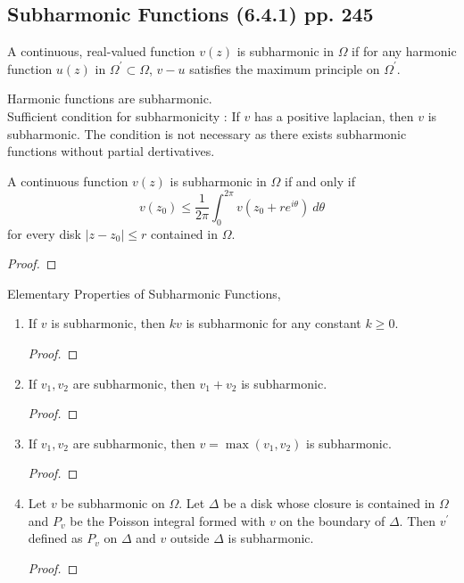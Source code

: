 \subsection{Subharmonic Functions (6.4.1) pp. 245}
\begin{definition}[subharmonic]
	A continuous, real-valued function $v(z)$ is subharmonic in $\Omega$ if for any harmonic function $u(z)$ in $\Omega^\prime \subset \Omega$, $v-u$ satisfies the maximum principle on $\Omega^\prime$.
\end{definition}

\begin{remark}
	Harmonic functions are subharmonic.\\
	
	Sufficient condition for subharmonicity : If $v$ has a positive laplacian, then $v$ is subharmonic. The condition is not necessary as there exists subharmonic functions without partial dertivatives.
\end{remark}

\begin{theorem}
	A continuous function $v(z)$ is subharmonic in $\Omega$ if and only if 
	\[ v(z_0) \le \frac{1}{2\pi} \int_0^{2\pi} v(z_0+re^{i\theta})\ d\theta \]
	for every disk $|z-z_0| \le r$ contained in $\Omega$.
\end{theorem}
\begin{proof}
\end{proof}

\begin{remark}
	Elementary Properties of Subharmonic Functions,
	\begin{enumerate}
		\item If $v$ is subharmonic, then $kv$ is subharmonic for any constant $k \ge 0$.
			\begin{proof}\end{proof}
		\item If $v_1,v_2$ are subharmonic, then $v_1+v_2$ is subharmonic.
			\begin{proof}\end{proof}
		\item If $v_1,v_2$ are subharmonic, then $v=\max(v_1,v_2)$ is subharmonic.
			\begin{proof}\end{proof}
		\item Let $v$ be subharmonic on $\Omega$. Let $\Delta$ be a disk whose closure is contained in $\Omega$ and $P_v$ be the Poisson integral formed with $v$ on the boundary of $\Delta$. Then $v^\prime$ defined as $P_v$ on $\Delta$ and $v$ outside $\Delta$ is subharmonic.
			\begin{proof}\end{proof}
	\end{enumerate}
\end{remark}

